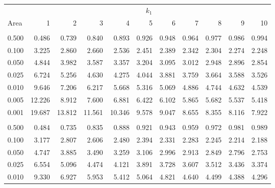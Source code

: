 \documentclass[
]{article}
\begin{document}
\begin{longtable}[t]{lrrrrrrrrrr}
\toprule
\multicolumn{1}{c}{ } & \multicolumn{10}{c}{$k_1$} \\
\cmidrule(l{3pt}r{3pt}){2-11}
Area & 1 & 2 & 3 & 4 & 5 & 6 & 7 & 8 & 9 & 10\\
\midrule
\addlinespace[0.3em]
\multicolumn{11}{l}{\textbf{$k_2=11$}}\\
\hspace{1em}0.500 & 0.486 & 0.739 & 0.840 & 0.893 & 0.926 & 0.948 & 0.964 & 0.977 & 0.986 & 0.994\\
\hspace{1em}0.100 & 3.225 & 2.860 & 2.660 & 2.536 & 2.451 & 2.389 & 2.342 & 2.304 & 2.274 & 2.248\\
\hspace{1em}0.050 & 4.844 & 3.982 & 3.587 & 3.357 & 3.204 & 3.095 & 3.012 & 2.948 & 2.896 & 2.854\\
\hspace{1em}0.025 & 6.724 & 5.256 & 4.630 & 4.275 & 4.044 & 3.881 & 3.759 & 3.664 & 3.588 & 3.526\\
\hspace{1em}0.010 & 9.646 & 7.206 & 6.217 & 5.668 & 5.316 & 5.069 & 4.886 & 4.744 & 4.632 & 4.539\\
\hspace{1em}0.005 & 12.226 & 8.912 & 7.600 & 6.881 & 6.422 & 6.102 & 5.865 & 5.682 & 5.537 & 5.418\\
\hspace{1em}0.001 & 19.687 & 13.812 & 11.561 & 10.346 & 9.578 & 9.047 & 8.655 & 8.355 & 8.116 & 7.922\\
\addlinespace[0.3em]
\multicolumn{11}{l}{\textbf{$k_2=12$}}\\
\hspace{1em}0.500 & 0.484 & 0.735 & 0.835 & 0.888 & 0.921 & 0.943 & 0.959 & 0.972 & 0.981 & 0.989\\
\hspace{1em}0.100 & 3.177 & 2.807 & 2.606 & 2.480 & 2.394 & 2.331 & 2.283 & 2.245 & 2.214 & 2.188\\
\hspace{1em}0.050 & 4.747 & 3.885 & 3.490 & 3.259 & 3.106 & 2.996 & 2.913 & 2.849 & 2.796 & 2.753\\
\hspace{1em}0.025 & 6.554 & 5.096 & 4.474 & 4.121 & 3.891 & 3.728 & 3.607 & 3.512 & 3.436 & 3.374\\
\hspace{1em}0.010 & 9.330 & 6.927 & 5.953 & 5.412 & 5.064 & 4.821 & 4.640 & 4.499 & 4.388 & 4.296\\

\end{longtable}
\end{document}

